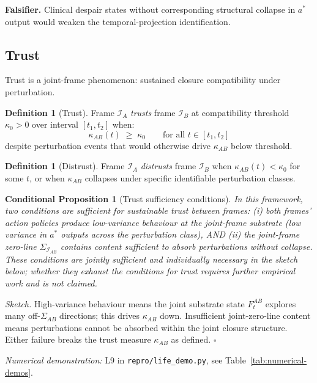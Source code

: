 \documentclass[11pt]{article}
\theoremstyle{plain}
\newtheorem{conditional}[theorem]{Conditional Proposition}
\theoremstyle{definition}
\newtheorem{definition}[theorem]{Definition}
\theoremstyle{remark}
\newcommand{\Ical}{\mathcal{I}}
\begin{document}
\textbf{Falsifier.} Clinical despair states without corresponding structural collapse in $a^*$ output would weaken the temporal-projection identification.

\subsection{Trust}\label{sec:trust}

Trust is a joint-frame phenomenon: sustained closure compatibility under perturbation.

\begin{definition}[Trust]\label{def:trust}
Frame $\Ical_A$ \emph{trusts} frame $\Ical_B$ at compatibility threshold $\kappa_0 > 0$ over interval $[t_1, t_2]$ when:
\[
  \kappa_{AB}(t) \;\geq\; \kappa_0 \qquad \text{for all } t \in [t_1, t_2]
\]
despite perturbation events that would otherwise drive $\kappa_{AB}$ below threshold.
\end{definition}

\begin{definition}[Distrust]\label{def:distrust}
Frame $\Ical_A$ \emph{distrusts} frame $\Ical_B$ when $\kappa_{AB}(t) < \kappa_0$ for some $t$, or when $\kappa_{AB}$ collapses under specific identifiable perturbation classes.
\end{definition}

\begin{conditional}[Trust sufficiency conditions]\label{thm:trust-stability}
In this framework, two conditions are sufficient for sustainable trust between frames: (i) both frames' action policies produce low-variance behaviour at the joint-frame substrate (low variance in $a^*$ outputs across the perturbation class), AND (ii) the joint-frame zero-line $\Sigma_{\Ical_{AB}}$ contains content sufficient to absorb perturbations without collapse. These conditions are jointly sufficient and individually necessary in the sketch below; whether they exhaust the conditions for trust requires further empirical work and is not claimed.
\end{conditional}

\noindent\emph{Sketch.} High-variance behaviour means the joint substrate state $F^{AB}_t$ explores many off-$\Sigma_{AB}$ directions; this drives $\kappa_{AB}$ down. Insufficient joint-zero-line content means perturbations cannot be absorbed within the joint closure structure. Either failure breaks the trust measure $\kappa_{AB}$ as defined. \hfill$\square$

\noindent\emph{Numerical demonstration:} L9 in \texttt{repro/life\_demo.py}, see Table~\ref{tab:numerical-demos}.
\end{document}
